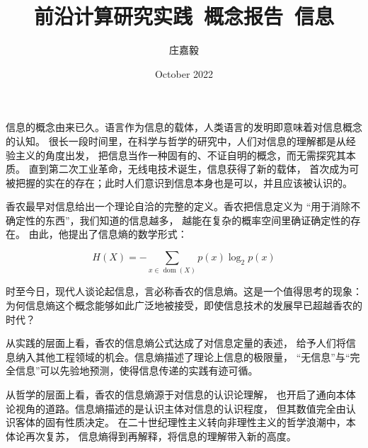 \documentclass{ctexart}
\title{前沿计算研究实践~概念报告~信息}
\author{庄嘉毅}
\date{October 2022}
\DeclareMathOperator{\dom}{dom}
\begin{document}
\maketitle

信息的概念由来已久。语言作为信息的载体，人类语言的发明即意味着对信息概念的认知。
很长一段时间里，在科学与哲学的研究中，人们对信息的理解都是从经验主义的角度出发，
把信息当作一种固有的、不证自明的概念，而无需探究其本质。
直到第二次工业革命，无线电技术诞生，信息获得了新的载体，
首次成为可被把握的实在的存在；此时人们意识到信息本身也是可以，并且应该被认识的。

香农最早对信息给出一个理论自洽的完整的定义。香农把信息定义为
“用于消除不确定性的东西”，我们知道的信息越多，
越能在复杂的概率空间里确证确定性的存在。
由此，他提出了信息熵的数学形式：

\begin{equation*}
H(X) = -\sum_{x\in\dom(X)} p(x)\log_2 p(x)
\end{equation*}

时至今日，现代人谈论起信息，言必称香农的信息熵。这是一个值得思考的现象：
为何信息熵这个概念能够如此广泛地被接受，即使信息技术的发展早已超越香农的时代？

从实践的层面上看，香农的信息熵公式达成了对信息定量的表述，
给予人们将信息纳入其他工程领域的机会。信息熵描述了理论上信息的极限量，
“无信息”与“完全信息”可以先验地预测，使得信息传递的实践有迹可循。

从哲学的层面上看，香农的信息熵源于对信息的认识论理解，
也开启了通向本体论视角的道路。信息熵描述的是认识主体对信息的认识程度，
但其数值完全由认识客体的固有性质决定。
在二十世纪理性主义转向非理性主义的哲学浪潮中，本体论再次复苏，
信息熵得到再解释，将信息的理解带入新的高度。
\end{document}
